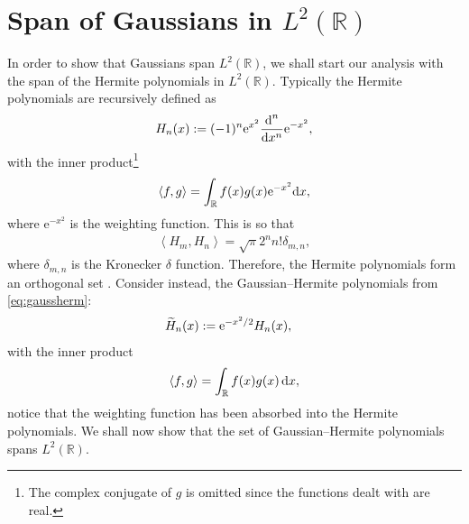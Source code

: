 
\chapter{Span of Gaussians in $L^2(\mathbb{R})$}
\label{chap:gauss}
In order to show that Gaussians span $L^2(\mathbb{R})$, we shall start our analysis with the span of the Hermite polynomials in $L^2(\mathbb{R})$. Typically the Hermite polynomials are recursively defined as \cite{conway, courant, teuwen}
\begin{align*}
H_n(x) := (-1)^n \textrm{e}^{x^2} \diff[n]{}{x} \textrm{e}^{-x^2},
\end{align*}
with the inner product\footnote{The complex conjugate of $g$ is omitted since the functions dealt with are real.}
\begin{align*}
\left< f, g \right> = \int_\mathbb{R} f(x) g(x) \textrm{e}^{-x^2} \df x,
\end{align*}
where $\textrm{e}^{-x^2}$ is the weighting function. This is so that 
\begin{align*}
\left< H_m, H_n \right> = \sqrt{\pi} 2^n n! \delta_{m,n},
\end{align*}
where $\delta_{m,n}$ is the Kronecker $\delta$ function. Therefore, the Hermite polynomials form an orthogonal set \cite{courant, hochstrasser, kreyszig, szego, teuwen}. Consider instead, the Gaussian--Hermite polynomials from \eqref{eq:gaussherm}:
\begin{align*}
\Her{n}{x} &:= \textrm{e}^{-x^2/2} H_n(x),
\end{align*}
with the inner product
\begin{align*}
\left< f, g \right> = \int_\mathbb{R} f(x) g(x) \, \df x,
\end{align*}
notice that the weighting function has been absorbed into the Hermite polynomials. We shall now show that the set of Gaussian--Hermite polynomials spans $L^2(\mathbb{R})$. \\

